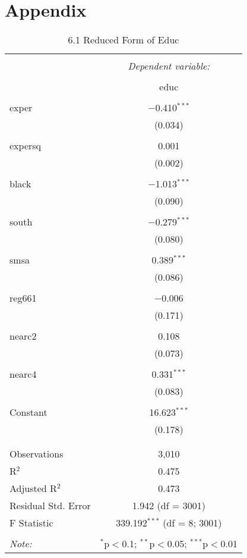 \documentclass[11pt]{article} %
\begin{document}
\appendix
\setcounter{secnumdepth}{0}
\section{Appendix}

\begin{table}[!htbp] \centering 
    \caption{6.1 Reduced Form of Educ} 
    \label{} 
  \begin{tabular}{@{\extracolsep{5pt}}lc} 
  \\[-1.8ex]\hline 
  \hline \\[-1.8ex] 
   & \multicolumn{1}{c}{\textit{Dependent variable:}} \\ 
  \cline{2-2} 
  \\[-1.8ex] & educ \\ 
  \hline \\[-1.8ex] 
   exper & $-$0.410$^{***}$ \\ 
    & (0.034) \\ 
    & \\ 
   expersq & 0.001 \\ 
    & (0.002) \\ 
    & \\ 
   black & $-$1.013$^{***}$ \\ 
    & (0.090) \\ 
    & \\ 
   south & $-$0.279$^{***}$ \\ 
    & (0.080) \\ 
    & \\ 
   smsa & 0.389$^{***}$ \\ 
    & (0.086) \\ 
    & \\ 
   reg661 & $-$0.006 \\ 
    & (0.171) \\ 
    & \\ 
   nearc2 & 0.108 \\ 
    & (0.073) \\ 
    & \\ 
   nearc4 & 0.331$^{***}$ \\ 
    & (0.083) \\ 
    & \\ 
   Constant & 16.623$^{***}$ \\ 
    & (0.178) \\ 
    & \\ 
  \hline \\[-1.8ex] 
  Observations & 3,010 \\ 
  R$^{2}$ & 0.475 \\ 
  Adjusted R$^{2}$ & 0.473 \\ 
  Residual Std. Error & 1.942 (df = 3001) \\ 
  F Statistic & 339.192$^{***}$ (df = 8; 3001) \\ 
  \hline 
  \hline \\[-1.8ex] 
  \textit{Note:}  & \multicolumn{1}{r}{$^{*}$p$<$0.1; $^{**}$p$<$0.05; $^{***}$p$<$0.01} \\ 
  \end{tabular} 
  \end{table} 
\end{document}
